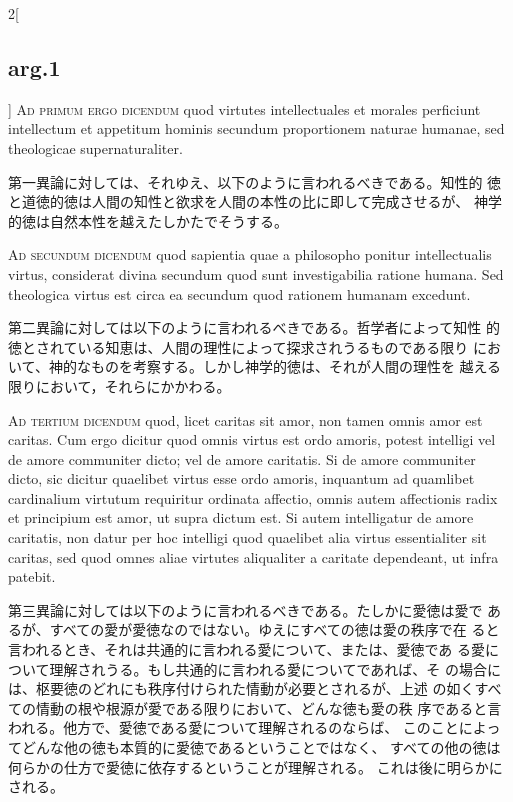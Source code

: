 \documentclass[paper=a4paper,fontsize=10pt,jafontsize=9pt,titlepage]{jlreq}
\begin{document}
\begin{paracol}{2}[\subsection{arg.1}]
{\scshape Ad primum ergo dicendum} quod virtutes intellectuales et
morales perficiunt intellectum et appetitum hominis secundum
proportionem naturae humanae, sed theologicae supernaturaliter.

\switchcolumn

第一異論に対しては、それゆえ、以下のように言われるべきである。知性的
 徳と道徳的徳は人間の知性と欲求を人間の本性の比に即して完成させるが、
 神学的徳は自然本性を越えたしかたでそうする。

\switchcolumn*[\subsection{ad.2}]

{\scshape Ad secundum dicendum} quod sapientia quae a philosopho
ponitur intellectualis virtus, considerat divina secundum quod sunt
investigabilia ratione humana. Sed theologica virtus est circa ea
secundum quod rationem humanam excedunt.

\switchcolumn

第二異論に対しては以下のように言われるべきである。哲学者によって知性
 的徳とされている知恵は、人間の理性によって探求されうるものである限り
 において、神的なものを考察する。しかし神学的徳は、それが人間の理性を
 越える限りにおいて，それらにかかわる。

\switchcolumn*[\subsection{ad.3}]

{\scshape Ad tertium dicendum} quod, licet caritas sit amor, non tamen
omnis amor est caritas. Cum ergo dicitur quod omnis virtus est ordo
amoris, potest intelligi vel de amore communiter dicto; vel de amore
caritatis. Si de amore communiter dicto, sic dicitur quaelibet virtus
esse ordo amoris, inquantum ad quamlibet cardinalium virtutum
requiritur ordinata affectio, omnis autem affectionis radix et
principium est amor, ut supra dictum est. Si autem intelligatur de
amore caritatis, non datur per hoc intelligi quod quaelibet alia
virtus essentialiter sit caritas, sed quod omnes aliae virtutes
aliqualiter a caritate dependeant, ut infra patebit.

\switchcolumn

第三異論に対しては以下のように言われるべきである。たしかに愛徳は愛で
 あるが、すべての愛が愛徳なのではない。ゆえにすべての徳は愛の秩序で在
 ると言われるとき、それは共通的に言われる愛について、または、愛徳であ
 る愛について理解されうる。もし共通的に言われる愛についてであれば、そ
 の場合には、枢要徳のどれにも秩序付けられた情動が必要とされるが、上述
 の如くすべての情動の根や根源が愛である限りにおいて、どんな徳も愛の秩
 序であると言われる。他方で、愛徳である愛について理解されるのならば、
 このことによってどんな他の徳も本質的に愛徳であるということではなく、
 すべての他の徳は何らかの仕方で愛徳に依存するということが理解される。
 これは後に明らかにされる。

\end{paracol}
\newpage
\end{document}
